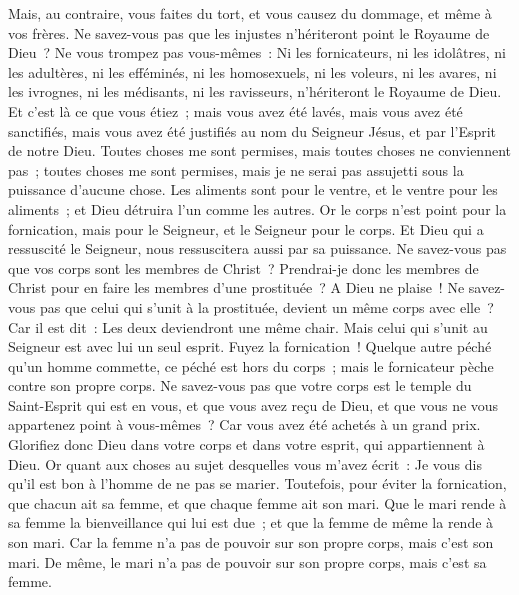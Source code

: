 \begin{multicols}{2}
Mais, au contraire, vous faites du tort, et vous causez du dommage, et même à vos frères. 
Ne savez-vous pas que les injustes n'hériteront point le Royaume de Dieu~? Ne vous trompez pas vous-mêmes~: Ni les fornicateurs, ni les idolâtres, ni les adultères,
ni les efféminés, ni les homosexuels, ni les voleurs, ni les avares, ni les ivrognes, ni les médisants, ni les ravisseurs, n'hériteront le Royaume de Dieu.
Et c'est là ce que vous étiez~; mais vous avez été lavés, mais vous avez été sanctifiés, mais vous avez été justifiés au nom du Seigneur Jésus, et par l'Esprit de notre Dieu.
Toutes choses me sont permises, mais toutes choses ne conviennent pas~; toutes choses me sont permises, mais je ne serai pas assujetti sous la puissance d'aucune chose. 
Les aliments sont pour le ventre, et le ventre pour les aliments~; et Dieu détruira l'un comme les autres. Or le corps n'est point pour la fornication, mais pour le Seigneur, et le Seigneur pour le corps.
Et Dieu qui a ressuscité le Seigneur, nous ressuscitera aussi par sa puissance.
Ne savez-vous pas que vos corps sont les membres de Christ~? Prendrai-je donc les membres de Christ pour en faire les membres d'une prostituée~? A Dieu ne plaise~!
Ne savez-vous pas que celui qui s'unit à la prostituée, devient un même corps avec elle~? Car il est dit~: Les deux deviendront une même chair.
Mais celui qui s'unit au Seigneur est avec lui un seul esprit.
Fuyez la fornication~! Quelque autre péché qu'un homme commette, ce péché est hors du corps~; mais le fornicateur pèche contre son propre corps.
Ne savez-vous pas que votre corps est le temple du Saint-Esprit qui est en vous, et que vous avez reçu de Dieu, et que vous ne vous appartenez point à vous-mêmes~?
Car vous avez été achetés à un grand prix. Glorifiez donc Dieu dans votre corps et dans votre esprit, qui appartiennent à Dieu.
\VerseOne{}Or quant aux choses au sujet desquelles vous m'avez écrit~: Je vous dis qu'il est bon à l'homme de ne pas se marier.
Toutefois, pour éviter la fornication, que chacun ait sa femme, et que chaque femme ait son mari.
Que le mari rende à sa femme la bienveillance qui lui est due~; et que la femme de même la rende à son mari.
Car la femme n'a pas de pouvoir sur son propre corps, mais c'est son mari. De même, le mari n'a pas de pouvoir sur son propre corps, mais c'est sa femme.

\end{multicols}

